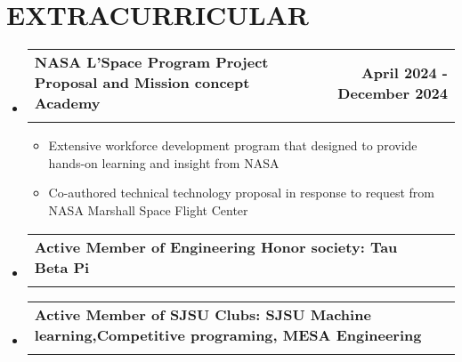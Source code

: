 \documentclass[letterpaper,11pt]{article}
\makeatletter
\newcommand{\resumeItem}[1]{
  \item\small{
    {#1 \vspace{-2pt}}
  }
}
\newcommand{\resumeSubheading}[4]{
  \vspace{-2pt}\item
    \begin{tabular*}{1.0\textwidth}[t]{l@{\extracolsep{\fill}}r}
      \textbf{#1} & \textbf{\small #2} \\
      {\small#3} & {\small #4} \\
    \end{tabular*}\vspace{-7pt}
}
\newcommand{\resumeSubHeadingListStart}{\begin{itemize}[leftmargin=0.0in, label={}]}
\newcommand{\resumeSubHeadingListEnd}{\end{itemize}}
\newcommand{\resumeItemListStart}{\begin{itemize}}
\newcommand{\resumeItemListEnd}{\end{itemize}\vspace{-5pt}}
\makeatother
\begin{document}
\section{EXTRACURRICULAR}
    \resumeSubHeadingListStart
      \resumeSubheading{NASA L'Space Program Project Proposal and Mission concept Academy }{April 2024 - December 2024}{}{}\vspace{-16pt}
      \resumeItemListStart
      \resumeItem{Extensive workforce development program that designed to provide hands-on learning and insight from NASA }
        \resumeItem{Co-authored technical technology proposal in response to request from NASA Marshall Space Flight Center}
        \resumeItemListEnd
      \resumeSubheading{Active Member of Engineering Honor society: Tau Beta Pi}{}{}{}\vspace{-16pt}
        \resumeSubheading{Active Member of SJSU Clubs: SJSU Machine learning,Competitive programing, MESA Engineering }{}{}{}
        \resumeSubHeadingListEnd

\end{document}
